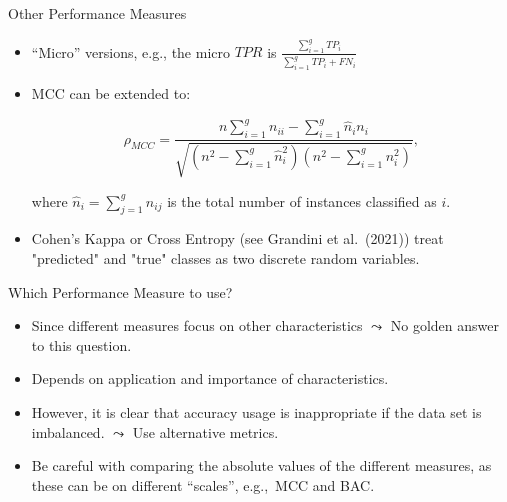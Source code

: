\documentclass[11pt,compress,t,notes=noshow, xcolor=table]{beamer}
\begin{document}
\begin{vbframe}{Other Performance Measures}

	\small{

		\begin{itemize}
		
			\item ``Micro'' versions, e.g., the micro $TPR$ is $\frac{\sum_{i=1}^g TP_i}{\sum_{i=1}^g TP_i + FN_i}$ 
            \vspace{10pt}
		
			\item MCC can be extended to:
			
			$$   \rho_{MCC} = \frac{ n  \sum_{i=1}^g n_{ii} -  \sum_{i=1}^g \hat n_i n_i}{\sqrt{ (n^2 - \sum_{i=1}^g \hat n_i^2)(n^2 - \sum_{i=1}^g n_i^2)  }},$$

			where $\hat n_i = \sum_{j=1}^g n_{ij}$ is the total number of instances classified as $i.$
            \vspace{10pt}
        
		
			\item Cohen's Kappa or Cross Entropy (see Grandini et al.\ (2021)) treat "predicted" and "true" classes as two discrete random variables.
		
		\end{itemize}
	}
\end{vbframe}


\begin{vbframe}{Which Performance Measure to use?}

	\small{

		\begin{itemize}

            \item Since different measures focus on other characteristics $\leadsto$ No golden answer to this question.
	
			\item Depends on application and importance of characteristics.

			\item However, it is clear that accuracy usage is inappropriate if the data set is imbalanced. $\leadsto$ Use alternative metrics.

			\item Be careful with comparing the absolute values of the different measures, as these can be on different ``scales'', e.g.,\ MCC and BAC. 
	
		\end{itemize}
	}
\end{vbframe}



%
\endlecture
\end{document}
